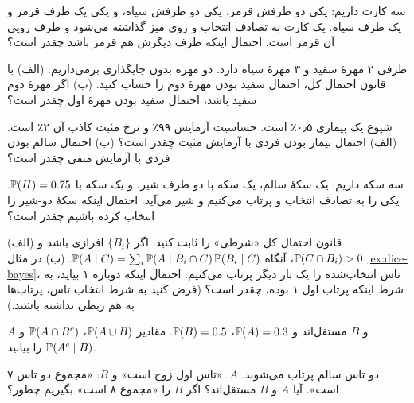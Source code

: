 \begin{exercise}[سه کارت]
سه کارت داریم: یکی دو طرفش قرمز، یکی دو طرفش سیاه، و یکی یک طرف قرمز و یک طرف سیاه. یک کارت به تصادف انتخاب و روی میز گذاشته می‌شود و طرف رویی آن قرمز است. احتمال اینکه طرف دیگرش هم قرمز باشد چقدر است؟
\end{exercise}

\begin{exercise}
ظرفی ۲ مهرهٔ سفید و ۳ مهرهٔ سیاه دارد. دو مهره بدون جایگذاری برمی‌داریم. (الف) با قانون احتمال کل، احتمال سفید بودن مهرهٔ دوم را حساب کنید. (ب) اگر مهرهٔ دوم سفید باشد، احتمال سفید بودن مهرهٔ اول چقدر است؟
\end{exercise}

\begin{exercise}
شیوع یک بیماری ۰٫۵٪ است. حساسیت آزمایش ۹۹٪ و نرخ مثبت کاذب آن ۲٪ است. (الف) احتمال بیمار بودن فردی با آزمایش مثبت چقدر است؟ (ب) احتمال سالم بودن فردی با آزمایش منفی چقدر است؟
\end{exercise}

\begin{exercise}
سه سکه داریم: یک سکهٔ سالم، یک سکه با دو طرف شیر، و یک سکه با $\P(H)=0.75$. یکی را به تصادف انتخاب و پرتاب می‌کنیم و شیر می‌آید. احتمال اینکه سکهٔ دو-شیر را انتخاب کرده باشیم چقدر است؟
\end{exercise}

\begin{exercise}\hard
(الف) قانون احتمال کل «شرطی» را ثابت کنید: اگر $\{B_i\}$ افرازی باشد و $\P(C\cap B_i)>0$، آنگاه
$\P(A\mid C)=\sum_i\P(A\mid B_i\cap C)\,\P(B_i\mid C)$.
(ب) در مثال \ref{ex:dice-bayes}، تاس انتخاب‌شده را یک بار دیگر پرتاب می‌کنیم. احتمال اینکه دوباره ۱ بیاید، به شرط اینکه پرتاب اول ۱ بوده، چقدر است؟ (فرض کنید به شرط انتخاب تاس، پرتاب‌ها به هم ربطی نداشته باشند.)
\end{exercise}

\begin{exercise}
$A$ و $B$ مستقل‌اند و $\P(A)=0.3$، $\P(B)=0.5$. مقادیر $\P(A\cup B)$، $\P(A\cap B^c)$ و $\P(A^c\mid B)$ را بیابید.
\end{exercise}

\begin{exercise}
دو تاس سالم پرتاب می‌شوند. $A$: «تاس اول زوج است» و $B$: «مجموع دو تاس ۷ است». آیا $A$ و $B$ مستقل‌اند؟ اگر $B$ را «مجموع ۸ است» بگیریم چطور؟
\end{exercise}

